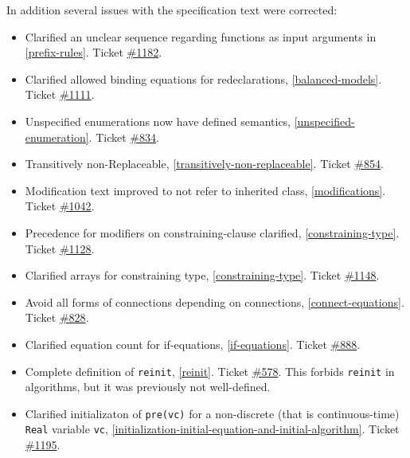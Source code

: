In addition several issues with the specification text were corrected:
\begin{itemize}
\item
  Clarified an unclear sequence regarding functions as input arguments
  in \cref{prefix-rules}. Ticket
  \href{https://github.com/modelica/ModelicaSpecification/issues/1182}{\#1182}.
\item
  Clarified allowed binding equations for redeclarations, \cref{balanced-models}.
  Ticket \href{https://github.com/modelica/ModelicaSpecification/issues/1111}{\#1111}.
\item
  Unspecified enumerations now have defined semantics, \cref{unspecified-enumeration}.
  Ticket \href{https://github.com/modelica/ModelicaSpecification/issues/834}{\#834}.
\item
  Transitively non-Replaceable, \cref{transitively-non-replaceable}. Ticket
  \href{https://github.com/modelica/ModelicaSpecification/issues/854}{\#854}.
\item
  Modification text improved to not refer to inherited class,
  \cref{modifications}. Ticket
  \href{https://github.com/modelica/ModelicaSpecification/issues/1042}{\#1042}.
\item
  Precedence for modifiers on constraining-clause clarified, \cref{constraining-type}. Ticket
  \href{https://github.com/modelica/ModelicaSpecification/issues/1128}{\#1128}.
\item
  Clarified arrays for constraining type, \cref{constraining-type}. Ticket
  \href{https://github.com/modelica/ModelicaSpecification/issues/1148}{\#1148}.
\item
  Avoid all forms of connections depending on connections,
  \cref{connect-equations}. Ticket
  \href{https://github.com/modelica/ModelicaSpecification/issues/828}{\#828}.
\item
  Clarified equation count for if-equations, \cref{if-equations}. Ticket
  \href{https://github.com/modelica/ModelicaSpecification/issues/888}{\#888}.
\item
  Complete definition of \lstinline!reinit!, \cref{reinit}.
  Ticket \href{https://github.com/modelica/ModelicaSpecification/issues/578}{\#578}.
  This forbids \lstinline!reinit! in algorithms, but it was previously not well-defined.
\item
  Clarified initializaton of \lstinline!pre(vc)! for a non-discrete (that is continuous-time) \lstinline!Real! variable \lstinline!vc!, \cref{initialization-initial-equation-and-initial-algorithm}.
  Ticket \href{https://github.com/modelica/ModelicaSpecification/issues/1195}{\#1195}.

\end{itemize}
